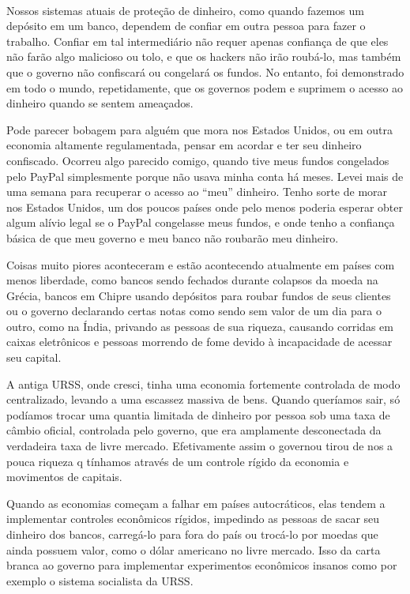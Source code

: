 \paragraph{}
Nossos sistemas atuais de proteção de dinheiro, como quando fazemos um depósito em um banco, dependem de confiar em outra pessoa para fazer o trabalho. Confiar em tal intermediário não requer apenas confiança de que eles não farão algo malicioso ou tolo, e que os hackers não irão roubá-lo, mas também que o governo não confiscará ou congelará os fundos. No entanto, foi demonstrado em todo o mundo, repetidamente, que os governos podem e suprimem o acesso ao dinheiro quando se sentem ameaçados.

Pode parecer bobagem para alguém que mora nos Estados Unidos, ou em outra economia altamente regulamentada, pensar em acordar e ter seu dinheiro confiscado. Ocorreu algo parecido comigo, quando tive meus fundos congelados pelo PayPal simplesmente porque não usava minha conta há meses. Levei mais de uma semana para recuperar o acesso ao “meu” dinheiro. Tenho sorte de morar nos Estados Unidos, um dos poucos países onde pelo menos poderia esperar obter algum alívio legal se o PayPal congelasse meus fundos, e onde tenho a confiança básica de que meu governo e meu banco não roubarão meu dinheiro.

Coisas muito piores aconteceram e estão acontecendo atualmente em países com menos liberdade, como bancos sendo fechados durante colapsos da moeda na Grécia, bancos em Chipre usando depósitos para roubar fundos de seus clientes ou o governo declarando certas notas como sendo sem valor de um dia para o outro, como na Índia, privando as pessoas de sua riqueza, causando corridas em caixas eletrônicos e pessoas morrendo de fome devido à incapacidade de acessar seu capital.

A antiga URSS, onde cresci, tinha uma economia fortemente controlada de modo centralizado, levando a uma escassez massiva de bens. Quando queríamos sair, só podíamos trocar uma quantia limitada de dinheiro por pessoa sob uma taxa de câmbio oficial, controlada pelo governo, que era amplamente desconectada da verdadeira taxa de livre mercado. Efetivamente assim o governou tirou de nos a pouca riqueza q tínhamos através de um controle rígido da economia e movimentos de capitais.

Quando as economias começam a falhar em países autocráticos, elas tendem a implementar controles econômicos rígidos, impedindo as pessoas de sacar seu dinheiro dos bancos, carregá-lo para fora do país ou trocá-lo por moedas que ainda possuem valor, como o dólar americano no livre mercado.
Isso da carta branca ao governo para implementar experimentos econômicos insanos como por exemplo o sistema socialista da URSS.

